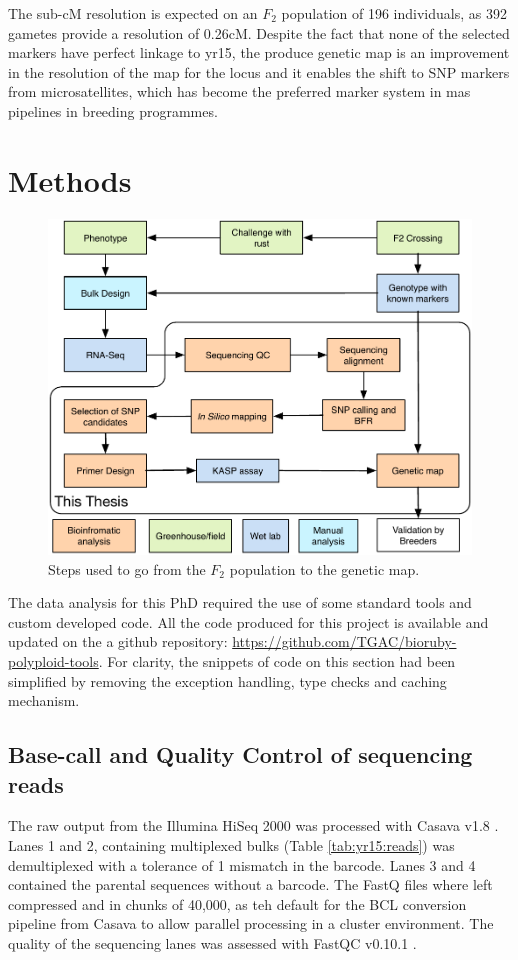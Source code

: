 The sub-cM resolution is expected on an $F_{2}$ population of 196 individuals, as 392 gametes provide a resolution of 0.26{}cM. 
Despite the fact that none of the selected markers have perfect linkage to \acrshort{yr15}, the produce genetic map is an improvement in the resolution of the map for the locus and it enables the shift to SNP markers from microsatellites, which has become the preferred marker system in \acrshort{mas} pipelines in breeding programmes. 


\section{Methods}
\label{yr15:methods}

\begin{figure}
\includegraphics[width=1\textwidth]{Yr15/Figures/pipeline.pdf}
\caption{Steps used to go from the $F_{2}$ population to the genetic map.}
\end{figure}

The data analysis for this PhD required the use of some standard tools and custom developed code. 
All the code produced for this project is available and updated on the a github repository: \url{https://github.com/TGAC/bioruby-polyploid-tools}. 
For clarity, the snippets of code on this section had been simplified by removing the exception handling, type checks and caching mechanism.

\subsection{Base-call and Quality Control of sequencing reads}
The raw output from the Illumina HiSeq 2000 was processed with Casava v1.8 \citep{casavaBCL}. 
Lanes 1 and 2, containing multiplexed bulks (Table \ref{tab:yr15:reads}) was demultiplexed with a tolerance of 1 mismatch in the barcode. 
Lanes 3 and 4 contained the parental sequences without a barcode. 
The FastQ files where left compressed and in chunks of 40,000, as teh default for the BCL conversion pipeline from Casava to allow parallel processing in a cluster environment. 
The quality of the sequencing lanes was assessed with FastQC v0.10.1 \citep{fastqc}. 

